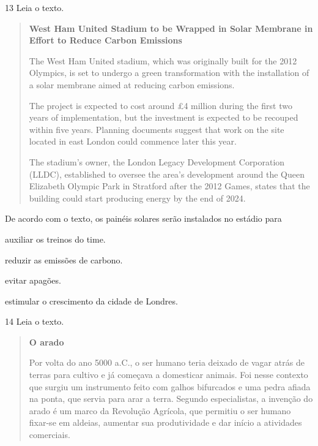 \pagebreak
\num{13} Leia o texto.

\begin{quote}
\textbf{West Ham United Stadium to be Wrapped in Solar Membrane in
Effort to Reduce Carbon Emissions}

The West Ham United stadium, which was originally built for the 2012
Olympics, is set to undergo a green transformation with the installation
of a solar membrane aimed at reducing carbon emissions.

The project is expected to cost around £4 million during the first two
years of implementation, but the investment is expected to be recouped
within five years. Planning documents suggest that work on the site
located in east London could commence later this year.

The stadium's owner, the London Legacy Development Corporation (LLDC),
established to oversee the area's development around the Queen Elizabeth
Olympic Park in Stratford after the 2012 Games, states that the building
could start producing energy by the end of 2024.

\end{quote}

De acordo com o texto, os painéis solares serão instalados no estádio
para

\begin{escolha}
\item auxiliar os treinos do time.

\item reduzir as emissões de carbono.

\item evitar apagões.

\item estimular o crescimento da cidade de Londres.
\end{escolha}

\num{14} Leia o texto.

\begin{quote}
\textbf{O arado}

Por volta do ano 5000 a.C., o ser humano
teria deixado de vagar atrás de terras
para cultivo e já começava a domesticar
animais. Foi nesse contexto que surgiu um
instrumento feito com galhos bifurcados e
uma pedra afiada na ponta, que servia
para arar a terra. Segundo especialistas,
a invenção do arado é um marco da Revolução Agrícola, que permitiu o ser humano fixar-se em aldeias, aumentar sua produtividade e dar início a atividades comerciais.

\end{quote}

